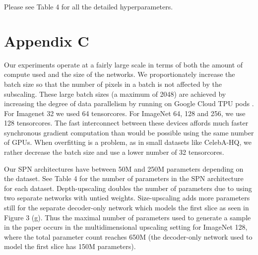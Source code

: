 \documentclass{article} \usepackage{iclr2019_conference,times}
\begin{document}
Please see Table 4 for all the detailed hyperparameters.

\section*{Appendix C}

Our experiments operate at a fairly large scale in terms of both the amount of compute used and the size of the networks. We proportionately increase the batch size so that the number of pixels in a batch is not affected by the subscaling. These large batch sizes (a maximum of 2048) are achieved by increasing the degree of data parallelism by running on Google Cloud TPU pods \citep{tpu}. For Imagenet 32 we used 64 tensorcores. For ImageNet 64, 128 and 256, we use 128 tensorcores. The fast interconnect between these devices affords much faster synchronous gradient computation than would be possible using the same number of GPUs. When overfitting is a problem, as in small datasets like CelebA-HQ, we rather decrease the batch size and use a lower number of 32 tensorcores. 

Our SPN architectures have between 50M and 250M parameters depending on the dataset. See Table 4 for the number of parameters in the SPN architecture for each dataset. Depth-upscaling doubles the number of parameters due to using two separate networks with untied weights. Size-upscaling adds more parameters still for the separate decoder-only network which models the first slice as seen in Figure 3 (g). Thus the maximal number of parameters used to generate a sample in the paper occurs in the multidimensional upscaling setting for ImageNet 128, where the total parameter count reaches 650M (the decoder-only network used to model the first slice has 150M parameters).
\end{document}
